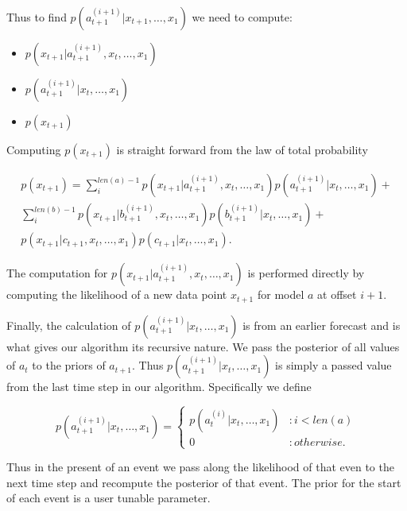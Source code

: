 Thus to find $p(a_{t + 1}^{(i + 1)}|x_{t + 1}, \ldots, x_{1})$ we need to compute:
\begin{itemize}
	\item $p(x_{t + 1}|a^{(i + 1)}_{t + 1}, x_{t}, \ldots, x_{1})$
	\item $p(a_{t + 1}^{(i + 1)}|x_{t}, \ldots, x_{1})$
	\item $p(x_{t + 1})$
\end{itemize} 

Computing $p(x_{t + 1})$ is straight forward from the law of total probability

\begin{equation}
	\begin{split}
		p(x_{t + 1}) = \sum_{i}^{len(a) - 1}p(x_{t + 1}|a_{t + 1}^{(i + 1)}, x_{t}, \ldots, x_{1})
						   p(a_{t + 1}^{(i + 1)}|x_{t}, \ldots, x_{1}) + \\
				      \sum_{i}^{len(b) - 1}p(x_{t + 1}|b_{t + 1}^{(i + 1)}, x_{t}, \ldots, x_{1}) 
						   p(b_{t + 1}^{(i + 1)}|x_{t}, \ldots, x_{1}) + \\
	        			      p(x_{t + 1}|c_{t + 1}, x_{t}, \ldots, x_{1})p(c_{t + 1}|x_{t}, \ldots, x_{1}).
	\end{split}
\end{equation}

The computation for $p(x_{t + 1}|a^{(i + 1)}_{t + 1}, x_{t}, \ldots, x_{1})$ is performed directly by computing the likelihood of a new data point $x_{t + 1}$ for model $a$ at offset $i + 1$.

Finally, the calculation of $p(a_{t + 1}^{(i + 1)}|x_{t}, \ldots, x_{1})$ is from an earlier forecast and is what gives our algorithm its recursive nature.  We pass the posterior of all values of $a_{t}$ to the priors of $a_{t + 1}.$  Thus $p(a_{t + 1}^{(i + 1)}|x_{t}, \ldots, x_{1})$ is simply a passed value from the last time step in our algorithm.  Specifically we define 

\begin{equation}
	p(a_{t + 1}^{(i + 1)} | x_{t}, \ldots, x_{1}) = 
		\begin{cases}
			p(a_{t}^{(i)}|x_{t}, \ldots, x_{1}) & : i < len(a) \\
			0 & : otherwise.
		\end{cases}
\end{equation}

Thus in the present of an event we pass along the likelihood of that even to the next time step and recompute the posterior of that event.  The prior for the start of each event is a user tunable parameter.  

